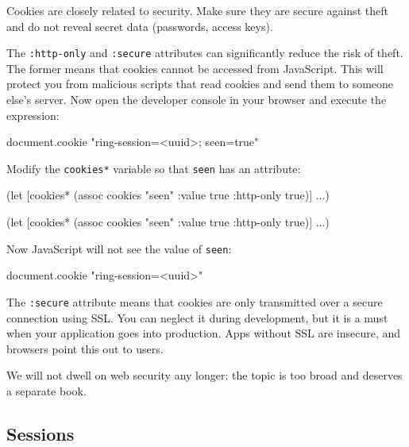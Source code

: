 
Cookies are closely related to security. Make sure they are secure against theft and do not reveal secret data (passwords, access keys).

The \verb|:http-only| and \verb|:secure| attributes can significantly reduce the risk of theft. The former means that cookies cannot be accessed from JavaScript. This will protect you from malicious scripts that read cookies and send them to someone else's server.  Now open the developer console in your browser and execute the expression:

\begin{js}
document.cookie
"ring-session=<uuid>; seen=true"
\end{js}

\noindent Modify the \verb|cookies*| variable so that \verb|seen| has an attribute:

\ifx\DEVICETYPE\MOBILE

\begin{clojure}
(let [cookies*
      (assoc cookies "seen"
        {:value true
         :http-only true})]
  ...)
\end{clojure}

\else

\begin{clojure}
(let [cookies* (assoc cookies "seen"
                      {:value true :http-only true})]
  ...)
\end{clojure}

\fi

Now JavaScript will not see the value of \verb|seen|:

\begin{js}
document.cookie
"ring-session=<uuid>"
\end{js}

The \verb|:secure| attribute means that cookies are only transmitted over a secure connection using SSL. You can neglect it during development, but it is a must when your application goes into production. Apps without SSL are insecure, and browsers point this out to users.

We will not dwell on web security any longer: the topic is too broad and deserves a separate book.

\subsection{Sessions}


